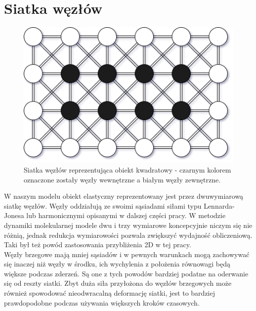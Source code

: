 \documentclass[12pt, letterpaper]{report}
\begin{document}
    \clearpage
    \section{Siatka węzłów}

    \begin{figure}
        \includegraphics[width=0.95\linewidth]{object_shema.png}
        \caption{
            Siatka węzłów reprezentująca obiekt kwadratowy - 
            czarnym kolorem oznaczone zostały węzły wewnętrzne a białym węzły zewnętrzne.
        }
    \end{figure}

    
    W naszym modelu obiekt elastyczny reprezentowany jest przez dwuwymiarową 
    siatkę węzłów. Węzły oddziałują ze swoimi sąsiadami siłami typu 
    Lennarda-Jonesa lub harmonicznymi opisanymi w dalszej części pracy.
    W metodzie dynamiki molekularnej modele dwu i trzy wymiarowe koncepcyjnie niczym się nie różnią, 
    jednak redukcja wymiarowości pozwala zwiększyć wydajność obliczeniową. 
    Taki był też powód zastosowania przybliżenia 2D w tej pracy. \\

    Węzły brzegowe mają mniej sąsiadów i w pewnych warunkach mogą zachowywać się inaczej niż węzły w środku, 
    ich wychylenia z położenia równowagi będą większe podczas zderzeń. Są one z tych powodów 
    bardziej podatne na oderwanie się od reszty siatki. Zbyt duża siła przyłożona do węzłów brzegowych 
    może również spowodować nieodwracalną deformację siatki, jest to bardziej prawdopodobne podczas 
    używania większych kroków czasowych.
    
\end{document}
